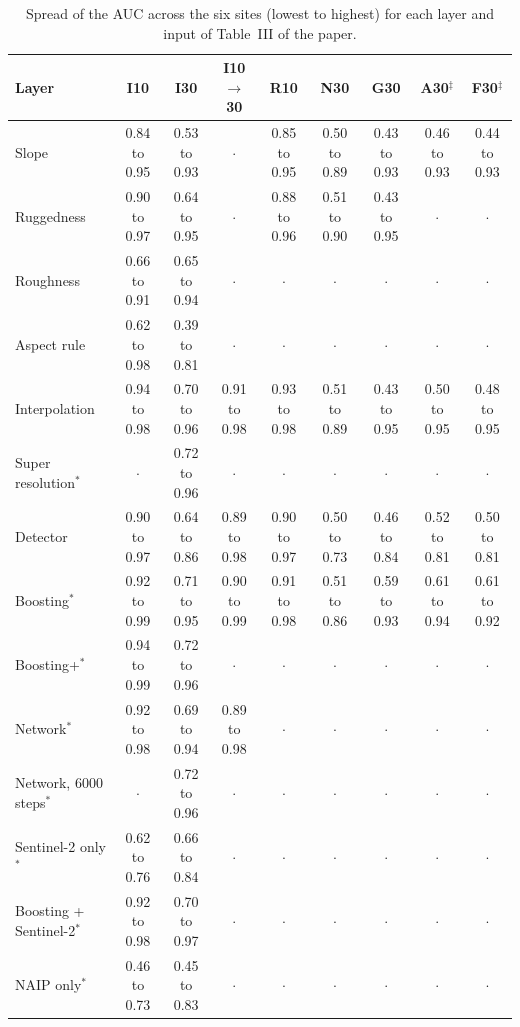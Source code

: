 \documentclass[10pt]{article}
\begin{document}
\begin{table}[H]
\caption{Spread of the AUC across the six sites (lowest to highest) for each layer and input of Table~III of the paper.}
\label{tab:spread}
\centering\scriptsize
\begin{tabular}{@{}lcccccccc@{}}
\toprule
Layer & I10 & I30 & I10$\rightarrow$30 & R10 & N30 & G30 & A30$^{\ddagger}$ & F30$^{\ddagger}$ \\
\midrule
Slope & 0.84 to 0.95 & 0.53 to 0.93 & $\cdot$ & 0.85 to 0.95 & 0.50 to 0.89 & 0.43 to 0.93 & 0.46 to 0.93 & 0.44 to 0.93 \\
Ruggedness & 0.90 to 0.97 & 0.64 to 0.95 & $\cdot$ & 0.88 to 0.96 & 0.51 to 0.90 & 0.43 to 0.95 & $\cdot$ & $\cdot$ \\
Roughness & 0.66 to 0.91 & 0.65 to 0.94 & $\cdot$ & $\cdot$ & $\cdot$ & $\cdot$ & $\cdot$ & $\cdot$ \\
Aspect rule & 0.62 to 0.98 & 0.39 to 0.81 & $\cdot$ & $\cdot$ & $\cdot$ & $\cdot$ & $\cdot$ & $\cdot$ \\
Interpolation & 0.94 to 0.98 & 0.70 to 0.96 & 0.91 to 0.98 & 0.93 to 0.98 & 0.51 to 0.89 & 0.43 to 0.95 & 0.50 to 0.95 & 0.48 to 0.95 \\
Super resolution$^{*}$ & $\cdot$ & 0.72 to 0.96 & $\cdot$ & $\cdot$ & $\cdot$ & $\cdot$ & $\cdot$ & $\cdot$ \\
Detector & 0.90 to 0.97 & 0.64 to 0.86 & 0.89 to 0.98 & 0.90 to 0.97 & 0.50 to 0.73 & 0.46 to 0.84 & 0.52 to 0.81 & 0.50 to 0.81 \\
Boosting$^{*}$ & 0.92 to 0.99 & 0.71 to 0.95 & 0.90 to 0.99 & 0.91 to 0.98 & 0.51 to 0.86 & 0.59 to 0.93 & 0.61 to 0.94 & 0.61 to 0.92 \\
Boosting+$^{*}$ & 0.94 to 0.99 & 0.72 to 0.96 & $\cdot$ & $\cdot$ & $\cdot$ & $\cdot$ & $\cdot$ & $\cdot$ \\
Network$^{*}$ & 0.92 to 0.98 & 0.69 to 0.94 & 0.89 to 0.98 & $\cdot$ & $\cdot$ & $\cdot$ & $\cdot$ & $\cdot$ \\
Network, 6000 steps$^{*}$ & $\cdot$ & 0.72 to 0.96 & $\cdot$ & $\cdot$ & $\cdot$ & $\cdot$ & $\cdot$ & $\cdot$ \\
Sentinel-2 only$^{*}$ & 0.62 to 0.76 & 0.66 to 0.84 & $\cdot$ & $\cdot$ & $\cdot$ & $\cdot$ & $\cdot$ & $\cdot$ \\
Boosting + Sentinel-2$^{*}$ & 0.92 to 0.98 & 0.70 to 0.97 & $\cdot$ & $\cdot$ & $\cdot$ & $\cdot$ & $\cdot$ & $\cdot$ \\
NAIP only$^{*}$ & 0.46 to 0.73 & 0.45 to 0.83 & $\cdot$ & $\cdot$ & $\cdot$ & $\cdot$ & $\cdot$ & $\cdot$ \\

\end{tabular}
\end{table}
\end{document}
